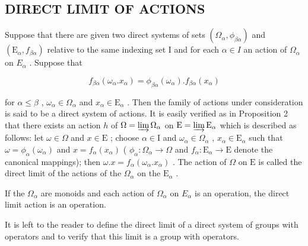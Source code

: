 \subsection{DIRECT LIMIT OF ACTIONS}

Suppose that there are given two direct systems of sets \((\Omega_{\alpha}, \phi_{\beta\alpha})\) and \((\mathrm{E}_{\alpha}, f_{\beta\alpha})\) relative to the same indexing set I and for each \(\alpha \in I\) an action of \(\Omega_{\alpha}\) on \(E_{\alpha}\) . Suppose that

\[
f _ {\beta \alpha} (\omega_ {\alpha}. x _ {\alpha}) = \phi_ {\beta \alpha} (\omega_ {\alpha}). f _ {\beta \alpha} (x _ {\alpha})
\]

for \(\alpha \leqslant \beta\) , \(\omega_{\alpha} \in \Omega_{\alpha}\) and \(x_{\alpha} \in \mathrm{E}_{\alpha}\) . Then the family of actions under consideration is said to be a direct system of actions. It is easily verified as in Proposition 2 that there exists an action \(h\) of \(\Omega = \varinjlim \Omega_{\alpha}\) on \(\mathrm{E} = \varinjlim \mathrm{E}_{\alpha}\) which is described as follows: let \(\omega \in \Omega\) and \(x \in \mathrm{E}\) ; choose \(\alpha \in \mathrm{I}\) and \(\omega_{\alpha} \in \Omega_{\alpha}\) , \(x_{\alpha} \in \mathrm{E}_{\alpha}\) such that \(\omega = \phi_{\alpha}(\omega_{\alpha})\) and \(x = f_{\alpha}(x_{\alpha})\) ( \(\phi_{\alpha}: \Omega_{\alpha} \to \Omega\) and \(f_{\alpha}: \mathrm{E}_{\alpha} \to \mathrm{E}\) denote the canonical mappings); then \(\omega . x = f_{\alpha}(\omega_{\alpha}. x_{\alpha})\) . The action of \(\Omega\) on \(\mathrm{E}\) is called the direct limit of the actions of the \(\Omega_{\alpha}\) on the \(\mathrm{E}_{\alpha}\) .

If the \(\Omega_{\alpha}\) are monoids and each action of \(\Omega_{\alpha}\) on \(E_{\alpha}\) is an operation, the direct limit action is an operation.

It is left to the reader to define the direct limit of a direct system of groups with operators and to verify that this limit is a group with operators.

